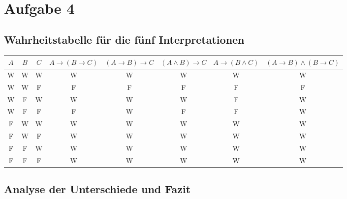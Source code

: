 \documentclass[a4paper]{scrartcl}
\begin{document}
\section*{Aufgabe 4}

\subsection*{Wahrheitstabelle für die fünf Interpretationen}

\begin{tabular}{|c|c|c|c|c|c|c|c|}
\hline
$A$ & $B$ & $C$ & $A \rightarrow (B \rightarrow C)$ & $(A \rightarrow B) \rightarrow C$ & $(A \land B) \rightarrow C$ & $A \rightarrow (B \land C)$ & $(A \rightarrow B) \land (B \rightarrow C)$ \\
\hline
W & W & W & W & W & W & W & W \\
W & W & F & F & F & F & F & F \\
W & F & W & W & W & W & F & W \\
W & F & F & F & W & F & F & W \\
F & W & W & W & W & W & W & W \\
F & W & F & W & W & W & W & W \\
F & F & W & W & W & W & W & W \\
F & F & F & W & W & W & W & W \\
\hline
\end{tabular}

\subsection*{Analyse der Unterschiede und Fazit}
\end{document}
